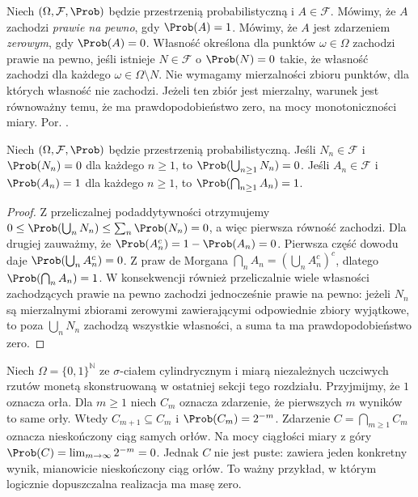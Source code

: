 \begin{definicja}
Niech $(\Omega,\mathcal F,\Prob)$ będzie przestrzenią
probabilistyczną i $A\in\mathcal F$. Mówimy, że $A$
zachodzi \emph{prawie na pewno}, gdy $\Prob(A)=1$.
Mówimy, że $A$ jest zdarzeniem \emph{zerowym}, gdy
$\Prob(A)=0$. Własność określona dla punktów $\omega\in\Omega$
zachodzi prawie na pewno, jeśli istnieje $N\in\mathcal F$
o $\Prob(N)=0$ takie, że własność zachodzi dla każdego
$\omega\in\Omega\setminus N$. Nie wymagamy mierzalności
zbioru punktów, dla których własność nie zachodzi. Jeżeli ten
zbiór jest mierzalny, warunek jest równoważny temu, że ma
prawdopodobieństwo zero, na mocy monotoniczności miary.
Por. .
\end{definicja}

\begin{stwierdzenie}
Niech $(\Omega,\mathcal F,\Prob)$ będzie przestrzenią
probabilistyczną. Jeśli $N_n\in\mathcal F$ i
$\Prob(N_n)=0$ dla każdego $n\geq1$, to
$\Prob(\bigcup_{n\geq1}N_n)=0$. Jeśli $A_n\in\mathcal F$
i $\Prob(A_n)=1$ dla każdego $n\geq1$, to
$\Prob(\bigcap_{n\geq1}A_n)=1$.
\end{stwierdzenie}
\begin{proof}
Z przeliczalnej podaddytywności otrzymujemy
$0\leq\Prob(\bigcup_nN_n)\leq\sum_n\Prob(N_n)=0$,
a więc pierwsza równość zachodzi. Dla drugiej zauważmy,
że $\Prob(A_n^c)=1-\Prob(A_n)=0$. Pierwsza część
dowodu daje
$\Prob(\bigcup_n A_n^c)=0$. Z praw de Morgana
$\bigcap_n A_n=(\bigcup_n A_n^c)^c$, dlatego
$\Prob(\bigcap_n A_n)=1$.
W konsekwencji również przeliczalnie wiele własności zachodzących
prawie na pewno zachodzi jednocześnie prawie na pewno:
jeżeli $N_n$ są mierzalnymi zbiorami zerowymi zawierającymi
odpowiednie zbiory wyjątkowe, to poza $\bigcup_n N_n$ zachodzą
wszystkie własności, a suma ta ma prawdopodobieństwo zero.
\end{proof}

\begin{przyklad}
Niech $\Omega=\{0,1\}^{\mathbb N}$ ze $\sigma$-ciałem
cylindrycznym i miarą niezależnych uczciwych rzutów monetą
skonstruowaną w ostatniej sekcji tego rozdziału. Przyjmijmy,
że $1$ oznacza orła. Dla $m\geq1$ niech $C_m$
oznacza zdarzenie, że pierwszych $m$ wyników to same orły.
Wtedy $C_{m+1}\subseteq C_m$ i $\Prob(C_m)=2^{-m}$.
Zdarzenie $C=\bigcap_{m\geq1}C_m$ oznacza nieskończony
ciąg samych orłów. Na mocy ciągłości miary z góry
$\Prob(C)=\lim_{m\to\infty}2^{-m}=0$.
Jednak $C$ nie jest puste: zawiera jeden konkretny wynik,
mianowicie nieskończony ciąg orłów. To ważny przykład,
w którym logicznie dopuszczalna realizacja ma masę zero.
\end{przyklad}

